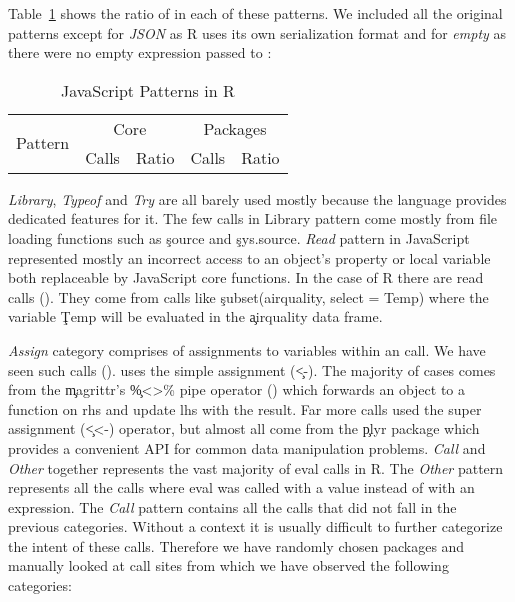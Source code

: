 \documentclass[USenglish,cleveref, autoref, thm-restate]{lipics-v2019}
\begin{document}
Table~\ref{table:js-pattens-in-r} shows the ratio of \eval in each of
these patterns. We included all the original patterns except for
\emph{JSON} as R uses its own serialization format and for
\emph{empty} as there were no empty expression passed to \eval:

\begin{table}[ht]%
  \centering
\begin{tabular}{r|r|r|r|r}\hline
\multirow{2}{*}{Pattern} & \multicolumn{2}{c|}{Core} & \multicolumn{2}{c}{Packages} \\
                       & Calls & Ratio            & Calls & Ratio \\\hline

\end{tabular}
\caption{JavaScript \eval Patterns in R}
\label{table:js-pattens-in-r}
\end{table}


\noindent \emph{Library}, \emph{Typeof} and \emph{Try} are all barely
used mostly because the language provides dedicated features for it.
The few calls in Library pattern come mostly from file loading
functions such as \c{source} and \c{sys.source}.
%
\noindent
\emph{Read} pattern in JavaScript represented mostly an incorrect
access to an object's property or local variable both replaceable by
JavaScript core functions. In the case of R there are \PatternReadRnd
read \eval calls (\PatternReadRatio). They come from calls like
\c{subset(airquality, select = Temp)} where the variable \c{Temp} will
be evaluated in the \c{airquality} data frame.

%
\noindent \emph{Assign} category comprises of assignments to variables
within an \eval call. We have seen \PatternAssignRnd such calls
(\PatternAssignRatio). \PatternAssignArrowRatio uses the simple
assignment (\c{<-}). The majority of cases comes from the
\c{magrittr}'s \c{\%<>\%} pipe operator
(\PatternAssignArrowMagrittrRatio) which forwards an object to a
function on rhs and update lhs with the result. Far more calls used
the super assignment (\c{<<-}) operator, but almost all come from the
\c{plyr} package which provides a convenient API for common data
manipulation problems.
%
\noindent \emph{Call} and \emph{Other} together represents the vast
majority of eval calls in R. The \emph{Other} pattern represents all
the calls where eval was called with a value instead of with an
expression. The \emph{Call} pattern contains all the calls that did
not fall in the previous categories. Without a context it is usually
difficult to further categorize the intent of these calls. Therefore
we have randomly chosen \PatternManualPackages packages and manually
looked at \PatternManualCallsites call sites from which we have
observed the following categories:
\end{document}
